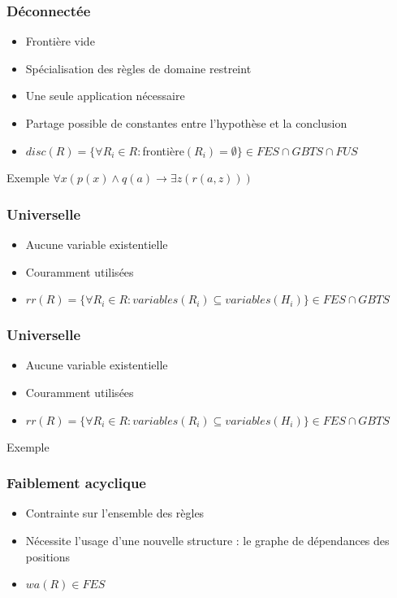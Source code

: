 \begin{frame}
	\frametitle{Déconnectée}
	\begin{itemize}
		\item Frontière vide
		\item Spécialisation des règles de domaine restreint
		\item Une seule application nécessaire
		\item Partage possible de constantes entre l'hypothèse et la conclusion
		\item $disc(R) = \{\forall R_i \in R : $frontière$(R_i) = \emptyset \} \in FES \cap GBTS \cap FUS$
	\end{itemize}
	\vspace{10mm}
	\begin{exampleblock}{Exemple}
		$\forall x (p(x) \wedge q(a) \rightarrow \exists z (r(a,z)))$
	\end{exampleblock}
\end{frame}

\begin{frame}
	\frametitle{Universelle}
	\begin{itemize}
		\item Aucune variable existentielle
		\item Couramment utilisées
		\item $rr(R) = \{\forall R_i \in R : variables(R_i) \subseteq variables(H_i) \}
		\in FES \cap GBTS$
	\end{itemize}
	\vspace{10mm}
\end{frame}

\begin{frame}
	\frametitle{Universelle}
	\begin{itemize}
		\item Aucune variable existentielle
		\item Couramment utilisées
		\item $rr(R) = \{\forall R_i \in R : variables(R_i) \subseteq variables(H_i) \}
		\in FES \cap GBTS$
	\end{itemize}
	\vspace{10mm}
	\begin{exampleblock}{Exemple}
	\end{exampleblock}
\end{frame}

\begin{frame}
	\frametitle{Faiblement acyclique}
	\begin{itemize}
		\item Contrainte sur l'ensemble des règles
		\item Nécessite l'usage d'une nouvelle structure : le graphe de dépendances des
		positions
		\item $wa(R) \in FES$
	\end{itemize}
\end{frame}

